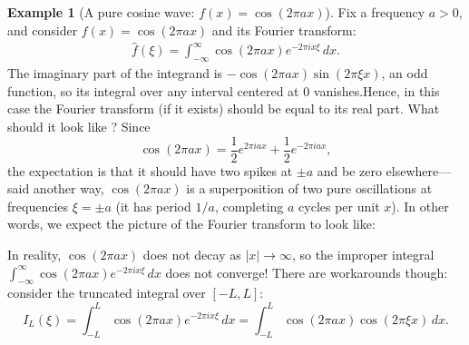 \documentclass[11pt]{article}
\theoremstyle{plain}
\theoremstyle{definition}
\newtheorem{example}[theorem]{Example}
\theoremstyle{boldremark}
\theoremstyle{remark}
\numberwithin{equation}{section}
\newcommand{\be}{\begin{eqnarray}}
\newcommand{\ee}{\end{eqnarray}}
\newenvironment{lecturefigure}
 {\par\addvspace{0.25em}\begingroup\setlength{\parskip}{0pt}\centering}
 {\par\endgroup\addvspace{0.25em}}
\begin{document}
\begin{example}[A pure cosine wave: $f(x)=\cos(2\pi ax)$]
Fix a frequency $a>0$, and consider $f(x)=\cos(2\pi ax)$ and its Fourier transform:
\be{} \widehat f (\xi)  = \int_{- \infty}^{\infty} \cos(2\pi ax) e^{ - 2 \pi i x \xi } \,dx. \ee
The imaginary part of the integrand is $-\cos(2\pi ax) \sin(2 \pi \xi x)$, an odd function, so its integral over any interval centered at $0$ vanishes.Hence, in this case the Fourier transform (if it exists) should be equal to its real part. What should it look like ? Since
\[
 \cos(2\pi ax) = \frac{1}{2}e^{2\pi iax} + \frac{1}{2}e^{-2\pi iax},
\]
the expectation is that it should have two spikes at $\pm a$ and be zero elsewhere--- said another way, $\cos(2 \pi ax)$ is a superposition of two pure oscillations at frequencies
$\xi=\pm a$ (it has period $1/a$, completing $a$ cycles per unit $x$). In other words, we expect the picture of the Fourier transform to look like:

\begin{lecturefigure}
\end{lecturefigure}



In reality, $\cos(2\pi ax)$ does not decay as
$|x|\to\infty$, so the improper integral
$\int_{-\infty}^{\infty}\cos(2\pi ax)e^{-2\pi ix\xi}\,dx$ does not
converge! There are workarounds though: consider the truncated integral
over $[-L,L]$:
\[
 I_L(\xi) = \int_{-L}^{L}\cos(2\pi ax)e^{-2\pi ix\xi}\,dx
          = \int_{-L}^{L}\cos(2\pi ax)\cos(2\pi\xi x)\,dx.
\]


\end{example}
\end{document}

